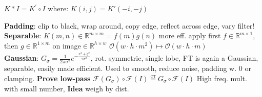 $K * I = K^{\prime} \circ I$ where: $K(i, j)=K'(-i,-j)$ 

\textbf{Padding}: clip to black, wrap around, copy edge, reflect across edge, vary filter!\\
\textbf{Separable}: $K(m, n)\in \mathbb{R}^{m\times m}=f(m) g(n)$ more eff. apply first $f\in \mathbb{R}^{m\times 1}$, then $g\in \mathbb{R}^{1\times m}$ on image$\in \mathbb{R}^{h\times w}$ $\mathcal{O}(w\cdot h \cdot m^2) \mapsto \mathcal{O}(w\cdot h \cdot m)$\\
\textbf{Gaussian}: $ G_\sigma= \frac{1}{2 \pi \sigma^2} e^{-\frac{x^2+y^2}{2 \sigma^2}}$, rot. symmetric, single lobe, FT is again a Gaussian, separable, easily made efficient. Used to smooth, reduce noise, padding w. 0 or clamping. \textbf{Prove low-pass} $\mathcal{F}(G_\sigma)\circ \mathcal{F}(I) \overset{\underset{\mathrm{CT}}{}}{=} G_\sigma\circ \mathcal{F}(I)$ High freq. mult. with small number, \textbf{Idea} weigh by dist.


